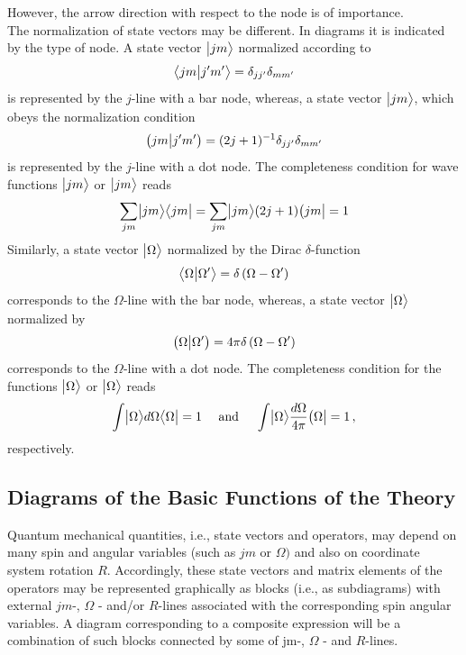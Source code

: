 However, the arrow direction with respect to the node is of importance.\\
The normalization of state vectors may be different. In diagrams it is indicated by the type of node. A state vector \(\bigl| j m \bigr\rangle\) normalized according to
\begin{equation}
\bigl\langle j m \big| j^{\prime} m^{\prime} \bigr\rangle=\delta_{j j^{\prime}} \delta_{m m^{\prime}}
\end{equation}
is represented by the \(j\)-line with a bar node, whereas, a state vector \(\bigl| j m \bigr\rangle\), which obeys the normalization condition
\begin{equation}
\bigl( j m \big| j^{\prime} m^{\prime} \bigr)=(2 j+1)^{-1} \delta_{j j^{\prime}} \delta_{m m^{\prime}}
\end{equation}
is represented by the \(j\)-line with a dot node. The completeness condition for wave functions \(\bigl| j m \bigr\rangle\) or \(\bigl| j m \bigr\rangle\)  reads
\begin{equation}
\sum_{j m}\bigl| j m \bigr\rangle\bigl\langle j m \bigr|=\sum_{j m}\bigl| j m \bigr\rangle(2 j+1)\bigl( j m \bigr|=1
\end{equation}
Similarly, a state vector \(\bigl| \Omega \bigr\rangle\) normalized by the Dirac \(\delta\)-function
\begin{equation}
\bigl\langle \Omega \big| \Omega^{\prime} \bigr\rangle=\delta\left(\Omega-\Omega^{\prime}\right)
\end{equation}
corresponds to the \(\Omega\)-line with the bar node, whereas, a state vector \(\bigl| \Omega \bigr\rangle\) normalized by
\begin{equation}
\bigl( \Omega \big| \Omega^{\prime} \bigr)=4 \pi \delta\left(\Omega-\Omega^{\prime}\right)
\end{equation}
corresponds to the \(\Omega\)-line with a dot node. The completeness condition for the functions \(\bigl| \Omega \bigr\rangle\) or \(\bigl| \Omega \bigr\rangle\) reads
\begin{equation}
\int\bigl| \Omega \bigr\rangle d \Omega\bigl\langle \Omega \bigr|=1 \quad \text { and } \quad \int \bigl| \Omega \bigr\rangle \frac{d \Omega}{4 \pi}\bigl( \Omega \bigr|=1\,,
\end{equation}
respectively.

\subsection{Diagrams of the Basic Functions of the Theory}\label{sec:11.1.2}
Quantum mechanical quantities, i.e., state vectors and operators, may depend on many spin and angular variables (such as \(j m\) or \(\Omega)\) and also on coordinate system rotation \(R\). Accordingly, these state vectors and matrix elements of the operators may be represented graphically as blocks (i.e., as subdiagrams) with external \(j m\)-, \(\Omega\) - and/or \(R\)-lines associated with the corresponding spin angular variables. A diagram corresponding to a composite expression will be a combination of such blocks connected by some of jm-, \(\Omega\) - and \(R\)-lines.

